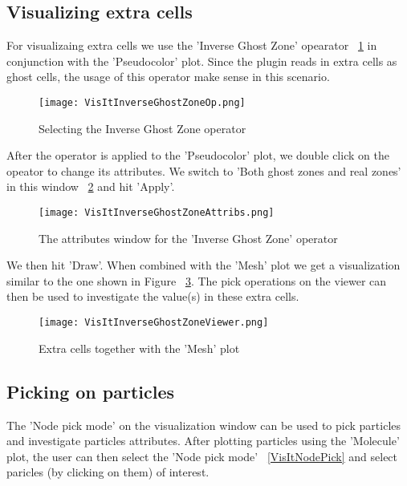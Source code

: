 \subsection{Visualizing extra cells}

For visualizaing extra cells we use the 'Inverse Ghost Zone' opearator ~\ref{VisItInverseGhostZoneOp} in conjunction with the 'Pseudocolor' plot. Since the plugin reads in extra cells as ghost cells, the usage of this operator make sense in this scenario.  

\begin{figure}
  \center
  \texttt{[image: VisItInverseGhostZoneOp.png]}
  \caption{Selecting the Inverse Ghost Zone operator}
  \label{VisItInverseGhostZoneOp}
\end{figure}

After the operator is applied to the 'Pseudocolor' plot, we double click on the opeator to change its attributes. We switch to 'Both ghost zones and real zones' in this window ~\ref{VisItInverseGhostZoneAttribs} and hit 'Apply'.

\begin{figure}
  \center
  \texttt{[image: VisItInverseGhostZoneAttribs.png]}
  \caption{The attributes window for the 'Inverse Ghost Zone' operator}
  \label{VisItInverseGhostZoneAttribs}
\end{figure}

We then hit 'Draw'. When combined with the 'Mesh' plot we get a visualization similar to the one shown in Figure ~\ref{VisItInverseGhostZoneViewer}. The pick operations on the viewer can then be used to investigate the value(s) in these extra cells. 

\begin{figure}
  \center
  \texttt{[image: VisItInverseGhostZoneViewer.png]}
  \caption{Extra cells together with the 'Mesh' plot}
  \label{VisItInverseGhostZoneViewer}
\end{figure}

\subsection{Picking on particles}

The 'Node pick mode' on the visualization window can be used to pick particles and investigate particles attributes. After plotting particles using the 'Molecule' plot, the user can then select the 'Node pick mode' ~\ref{VisItNodePick} and select paricles (by clicking on them) of interest. 

